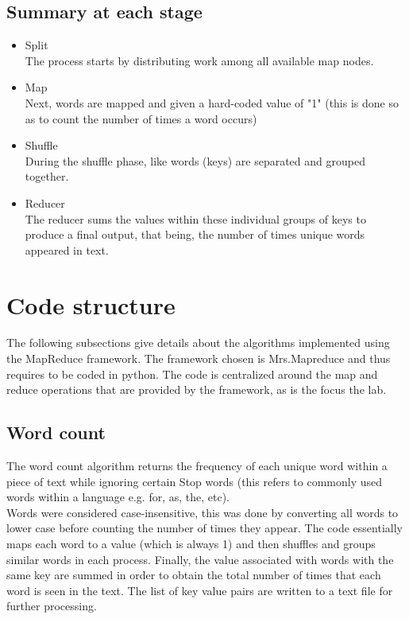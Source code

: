 \documentclass[11pt,journal]{article}
\begin{document}
\subsection{Summary at each stage}
 \begin{itemize}
 
     \item Split\\
     The process starts by distributing work among all available map nodes.
     \item Map\\
     Next, words are mapped and given a hard-coded value of "1" (this is done so as to count the number of times a word occurs)
     \item Shuffle\\
     During the shuffle phase, like words (keys) are separated and grouped together.
     \item Reducer\\
     The reducer sums the values within these individual groups of keys to produce a final output, that being, the number of times unique words appeared in text.
 \end{itemize}

\section{Code structure}

The following subsections give details about the algorithms implemented using the MapReduce framework. The framework chosen is Mrs.Mapreduce and thus requires to be coded in python. The code is centralized around the map and reduce operations that are provided by the framework, as is the focus the lab.  
\subsection{Word count}
The word count algorithm returns the frequency of each unique word within a piece of text while ignoring certain Stop words (this refers to commonly used words within a language e.g. for, as, the, etc).\\ Words were considered case-insensitive, this was done by converting all words to lower case before counting the number of times they appear. The code essentially maps each word to a value (which is always 1) and then shuffles and groups similar words in each process. Finally, the value associated with words with the same key are summed in order to obtain the total number of times that each word is seen in the text. The list of key value pairs are written to a text file for further processing.
\end{document}

